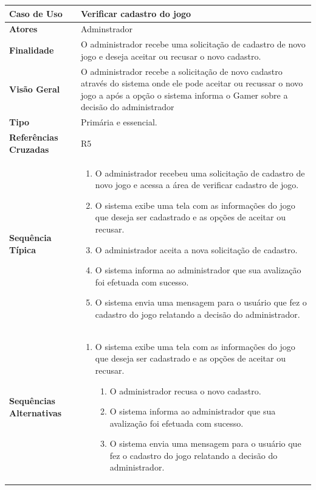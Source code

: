 \documentclass[a4paper,11pt]{article}
\begin{document}
\begin{table}[H]
		\begin{tabularx}{\textwidth}{|l|X|}
		\hline
			\textbf{Caso de Uso} &  Verificar cadastro do jogo \\ \hline
			\textbf{Atores} &   Adminstrador \\ \hline
			\textbf{Finalidade} &  O administrador recebe uma solicitação de cadastro de novo jogo e deseja aceitar ou recusar o novo cadastro. \\ \hline
			\textbf{Visão Geral} & O administrador recebe a solicitação de novo cadastro através do sistema onde ele pode aceitar ou recussar o novo jogo a após a opção o sistema informa o Gamer sobre a decisão do administrador  \\ \hline
			\textbf{Tipo} & Primária e essencial. \\ \hline
			\textbf{Referências Cruzadas} & R5 \\ \hline
			\textbf{Sequência Típica} & 
			\begin{enumerate}
			\item O administrador recebeu uma solicitação de cadastro de novo jogo e acessa a área de verificar cadastro de jogo.
			\item O sistema exibe uma tela com as informações do jogo que deseja ser cadastrado e as opções de aceitar ou recusar. 
			\item O administrador aceita a nova solicitação de cadastro.
			\item O sistema informa ao administrador que sua avalização foi efetuada com sucesso.
			\item O sistema envia uma mensagem para o usuário que fez o cadastro do jogo relatando a decisão do administrador.
			
			\end{enumerate} \\ \hline
			\textbf{Sequências Alternativas} & 
			\begin{enumerate}
			\item O sistema exibe uma tela com as informações do jogo que deseja ser cadastrado e as opções de aceitar ou recusar.
			\begin{enumerate}
			\item O administrador recusa o novo cadastro.
			\item O sistema informa ao administrador que sua avalização foi efetuada com sucesso.
			\item O sistema envia uma mensagem para o usuário que fez o cadastro do jogo relatando a decisão do administrador.
			\end{enumerate}
			\end{enumerate} \\ \hline
		\end{tabularx}
\end{table}
\end{document}

